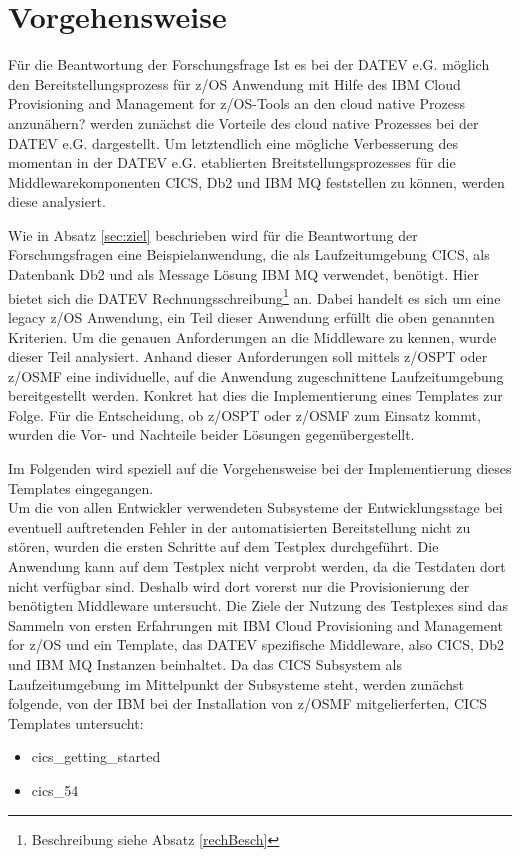 \chapter{Vorgehensweise}\label{ch:vorgehensweise}
Für die Beantwortung der Forschungsfrage \glqq Ist es bei der DATEV e.G. möglich den Bereitstellungsprozess für z/OS Anwendung mit Hilfe des \glqq IBM Cloud Provisioning and Management for z/OS\grqq-Tools an den cloud native Prozess anzunähern?\grqq{} werden zunächst die Vorteile des cloud native Prozesses bei der DATEV e.G. dargestellt.
Um letztendlich eine mögliche Verbesserung des momentan in der DATEV e.G. etablierten Breitstellungsprozesses für die Middlewarekomponenten CICS, Db2 und IBM MQ feststellen zu können, werden diese analysiert.

Wie in Absatz \ref{sec:ziel} beschrieben wird für die Beantwortung der Forschungsfragen eine Beispielanwendung, die als Laufzeitumgebung CICS, als Datenbank Db2 und als Message Lösung IBM MQ verwendet, benötigt.
Hier bietet sich die \glqq DATEV Rechnungsschreibung\grqq{}\footnote{Beschreibung siehe Absatz \ref{rechBesch}} an.
Dabei handelt es sich um eine legacy z/OS Anwendung, ein Teil dieser Anwendung erfüllt die oben genannten Kriterien.
Um die genauen Anforderungen an die Middleware zu kennen, wurde dieser Teil analysiert.
Anhand dieser Anforderungen soll mittels z/OSPT oder z/OSMF eine individuelle, auf die Anwendung zugeschnittene Laufzeitumgebung bereitgestellt werden.
Konkret hat dies die Implementierung eines Templates zur Folge.
Für die Entscheidung, ob z/OSPT oder z/OSMF zum Einsatz kommt, wurden die Vor- und Nachteile beider Lösungen gegenübergestellt.

Im Folgenden wird speziell auf die Vorgehensweise bei der Implementierung dieses Templates eingegangen.\\
Um die von allen Entwickler verwendeten Subsysteme der Entwicklungsstage bei eventuell auftretenden Fehler in der automatisierten Bereitstellung nicht zu stören, wurden die ersten Schritte auf dem Testplex durchgeführt.
Die Anwendung kann auf dem Testplex nicht verprobt werden, da die Testdaten dort nicht verfügbar sind.
Deshalb wird dort vorerst nur die Provisionierung der benötigten Middleware untersucht.
Die Ziele der Nutzung des Testplexes sind das Sammeln von ersten Erfahrungen mit \glqq IBM Cloud Provisioning and Management for z/OS\grqq{} und ein Template, das DATEV spezifische Middleware, also CICS, Db2 und IBM MQ Instanzen beinhaltet.
Da das CICS Subsystem als Laufzeitumgebung im Mittelpunkt der Subsysteme steht, werden zunächst folgende, von der IBM bei der Installation von z/OSMF mitgelierferten, CICS Templates untersucht:
\begin{itemize}
\item \glqq cics\_getting\_started\grqq
\item \glqq cics\_54\grqq
\end{itemize}

